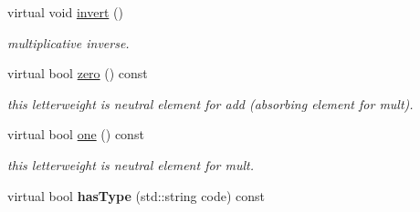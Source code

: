 \begin{DoxyCompactItemize}
\item 
virtual void \mbox{\hyperlink{group__weight_ga2bad107be8a2e71fc12b75196adde070}{invert}} ()
\begin{DoxyCompactList}\small\item\em multiplicative inverse. \end{DoxyCompactList}\item 
virtual bool \mbox{\hyperlink{group__weight_ga55f1e2bcb9e1e3fd521d652a5aebfc36}{zero}} () const
\begin{DoxyCompactList}\small\item\em this letterweight is neutral element for add (absorbing element for mult). \end{DoxyCompactList}\item 
virtual bool \mbox{\hyperlink{group__weight_gae362229d75df663272f4d52c15a04315}{one}} () const
\begin{DoxyCompactList}\small\item\em this letterweight is neutral element for mult. \end{DoxyCompactList}\item 
\mbox{\label{classTropicalWeight_a276bcd4dd3d61887d1628e63665edd7e}} 
virtual bool {\bfseries has\+Type} (std\+::string code) const
\end{DoxyCompactItemize}
